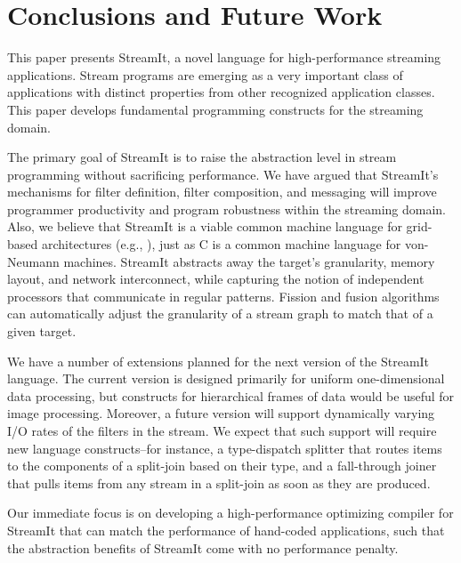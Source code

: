\vspace{-5pt}
\section{Conclusions and Future Work}
\label{sec:conc}
\vspace{-5pt}

This paper presents StreamIt, a novel language for high-performance
streaming applications.  Stream programs are emerging as a very
important class of applications with distinct properties from other
recognized application classes.  This paper develops fundamental
programming constructs for the streaming domain.

The  primary goal of  StreamIt is  to raise  the abstraction  level in
stream  programming without sacrificing  performance.  We  have argued
that StreamIt's mechanisms  for filter definition, filter composition,
and  messaging  will   improve  programmer  productivity  and  program
robustness within the streaming domain. Also, we believe that StreamIt
is  a  viable common  machine  language  for grid-based  architectures
(e.g.,  \cite{smartmemories,rawshort,trips}), just  as C  is  a common
machine  language for von-Neumann  machines.  StreamIt  abstracts away
the  target's granularity,  memory layout,  and  network interconnect,
while capturing the notion  of independent processors that communicate
in regular patterns.  Fission  and fusion algorithms can automatically
adjust the  granularity of  a stream  graph to match  that of  a given
target.

We have  a number of  extensions planned for  the next version  of the
StreamIt  language.  The  current  version is  designed primarily  for
uniform   one-dimensional   data   processing,  but   constructs   for
hierarchical  frames of  data would  be useful  for  image processing.
Moreover, a future version  will support dynamically varying I/O rates
of  the filters  in  the stream.   We  expect that  such support  will
require  new   language  constructs--for  instance,   a  type-dispatch
splitter that routes items to  the components of a split-join based on
their type, and a fall-through joiner that pulls items from any stream
in a split-join as soon as they are produced.

Our  immediate focus  is on  developing a  high-performance optimizing
compiler  for StreamIt that  can match  the performance  of hand-coded
applications, such that the abstraction benefits of StreamIt come with
no performance penalty.


